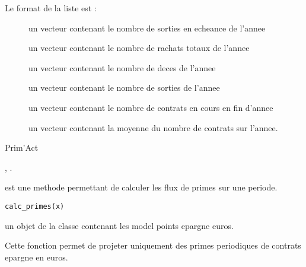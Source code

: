 \documentclass[a4paper]{book}
\begin{document}
\begin{Value}
\begin{description}
\end{description}


Le format de la liste  est :
\begin{description}

\item[] un vecteur contenant le nombre de sorties en echeance de l'annee
\item[] un vecteur contenant le nombre de rachats totaux de l'annee
\item[] un vecteur contenant le nombre de deces de l'annee
\item[] un vecteur contenant le nombre de sorties de l'annee
\item[] un vecteur contenant le nombre de contrats en cours en fin d'annee
\item[] un vecteur contenant la moyenne du nombre de contrats sur l'annee.

\end{description}

\end{Value}
%
\begin{Author}\relax
Prim'Act
\end{Author}
%
\begin{SeeAlso}\relax
{}, .
\end{SeeAlso}
%
\begin{Description}\relax
{} est une methode permettant de calculer les flux de primes sur
une periode.
\end{Description}
%
\begin{Usage}
\begin{verbatim}
calc_primes(x)
\end{verbatim}
\end{Usage}
%
\begin{Arguments}
\begin{ldescription}
\item[\code{x}] un objet de la classe  contenant les model points epargne euros.
\end{ldescription}
\end{Arguments}
%
\begin{Details}\relax
Cette fonction permet de projeter uniquement des primes periodiques de contrats epargne en euros.
\end{Details}
\end{document}
